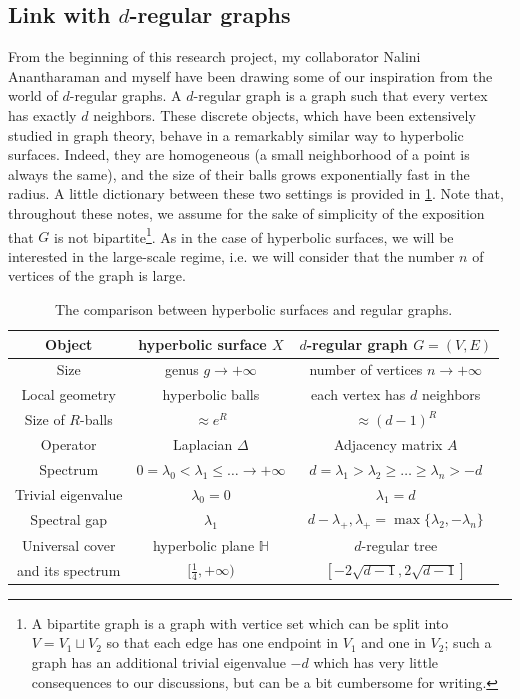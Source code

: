 \documentclass[12pt,twoside]{article}
\theoremstyle{theorem}
\theoremstyle{remark}
\theoremstyle{definition}
\theoremstyle{example}
\newcommand{\IH}{\mathbb{H}}
\newcommand{\1}[1]{\mathds{1}_{#1}}
\begin{document}
\subsection{Link with $d$-regular graphs}
\label{sec:link-d-reg}

From the beginning of this research project, my collaborator Nalini Anantharaman and myself have
been drawing some of our inspiration from the world of $d$-regular graphs. A $d$-regular graph is a
graph such that every vertex has exactly $d$ neighbors.  These discrete objects, which have been
extensively studied in graph theory, behave in a remarkably similar way to hyperbolic
surfaces. Indeed, they are homogeneous (a small neighborhood of a point is always the same), and the
size of their balls grows exponentially fast in the radius. A little dictionary between these two
settings is provided in \cref{tab:comp_graph}. Note that, throughout these notes, we assume for the
sake of simplicity of the exposition that $G$ is not bipartite\footnote{A bipartite graph is a graph
  with vertice set which can be split into $V=V_1 \sqcup V_2$ so that each edge has one endpoint in
  $V_1$ and one in $V_2$; such a graph has an additional trivial eigenvalue $-d$ which has very
  little consequences to our discussions, but can be a bit cumbersome for writing.}. As in the case
of hyperbolic surfaces, we will be interested in the large-scale regime, i.e. we will consider that
the number $n$ of vertices of the graph is large.

\begin{table}[h]
  \centering
  \begin{tabular}{|c|c|c|}
    \hline
    Object & hyperbolic surface $X$ & $d$-regular graph $G=(V,E)$ \\
    \hline
    Size & genus $g \rightarrow + \infty$ & number of vertices $n \rightarrow + \infty$ \\
    \hline
    Local geometry & hyperbolic balls & each vertex has $d$ neighbors \\
    Size of $R$-balls
         & $\approx e^R$ & $\approx (d-1)^R$ \\
    \hline
    Operator
           & Laplacian $\Delta$
             & Adjacency matrix $A$ \\
    Spectrum & $0 = \lambda_0 < \lambda_1 \leq \ldots \rightarrow + \infty$
                                          & $d = \lambda_1 > \lambda_2 \geq \ldots \geq \lambda_n
                                            > -d$ \\
    Trivial eigenvalue
         & $\lambda_0=0$
                                    & $\lambda_1=d$\\
    Spectral gap & $\lambda_1$ & $d-\lambda_+, \lambda_+=\max \{\lambda_2,-\lambda_n\}$ \\
    \hline
    Universal cover & hyperbolic plane $\IH$ & $d$-regular tree \\
    and its spectrum & $[\frac 14, + \infty)$
                                           & $[-2\sqrt{d-1},2\sqrt{d-1}]$\\
    \hline
  \end{tabular}
  \caption{The comparison between hyperbolic surfaces and regular graphs.}
  \label{tab:comp_graph}
\end{table}
\end{document}
